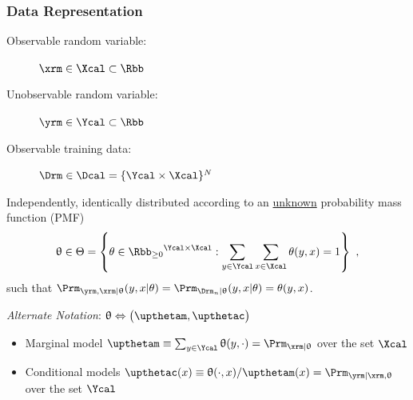 \documentclass[aspectratio=169]{beamer}
\begin{document}
\begin{frame}
\frametitle{Data Representation}

\begin{description}
\item[Observable random variable:] $\xrm \in \Xcal \subset \Rbb$
\item[Unobservable random variable:] $\yrm \in \Ycal \subset \Rbb$
\item[Observable training data:] $\Drm \in \Dcal = \{\Ycal \times \Xcal\}^N$
\end{description}

\vspace{0.5em}

Independently, identically distributed according to an \underline{unknown} probability mass function (PMF) 
\begin{equation*}
\uptheta \in \Theta = \left\{ \theta \in {\Rbb_{\geq 0}}^{\Ycal \times \Xcal}: \sum_{y \in \Ycal} \sum_{x \in \Xcal} \theta(y,x) = 1 \right\} \ ,
\end{equation*}
such that $\Prm_{\yrm,\xrm | \uptheta}(y,x | \theta) = \Prm_{\Drm_n | \uptheta}(y,x | \theta) = \theta(y,x)$.

\hrulefill

\vspace{0.5em}
\textit{Alternate Notation}: $\uptheta \Leftrightarrow \big( \upthetam,\upthetac \big)$
\begin{itemize}
\item Marginal model $\upthetam \equiv \sum_{y \in \Ycal} \uptheta(y,\cdot) = \Prm_{\xrm | \uptheta}$ over the set $\Xcal$ 
\item Conditional models $\upthetac(x) \equiv \uptheta(\cdot,x) / \upthetam(x) = \Prm_{\yrm | \xrm,\uptheta}$ over the set $\Ycal$
\end{itemize}

\end{frame}
\end{document}
